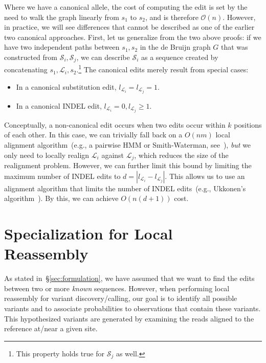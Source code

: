 \documentclass[11pt]{article}
\begin{document}
Where we have a canonical allele, the cost of computing the edit is set by the need to walk the graph
linearly from $s_1$ to $s_2$, and is therefore $\mathcal{O}(n)$. However, in practice, we will see
differences that cannot be described as one of the earlier two canonical approaches. First, let us
generalize from the two above proofs: if we have two independent paths between $s_1, s_2$ in the
de Bruijn graph $G$ that was constructed from $\mathcal{S}_i, \mathcal{S}_j$, we can describe
$\mathcal{S}_i$ as a sequence created by concatenating $s_1, \mathcal{L}_i, s_2$.\footnote{This
property holds true for $\mathcal{S}_j$ as well.} The canonical edits merely result from special cases:

\begin{itemize}
\item In a canonical substitution edit, $l_{\mathcal{L}_i} = l_{\mathcal{L}_j} = 1$.
\item In a canonical INDEL edit, $l_{\mathcal{L}_i} = 0, l_{\mathcal{L}_j} \ge 1$.
\end{itemize}

Conceptually, a non-canonical edit occurs when two edits occur within $k$ positions of each other. In
this case, we can trivially fall back on a $O(nm)$ local alignment algorithm~(e.g., a pairwise HMM or
Smith-Waterman, see~\cite{durbin98,smith81}), \emph{but} we only need to locally realign
$\mathcal{L}_i$ against $\mathcal{L}_j$, which reduces the size of the realignment problem. However, we
can further limit this bound by limiting the maximum number of INDEL edits to $d = | l_{\mathcal{L}_i} -
l_{\mathcal{L}_j} |$. This allows us to use an alignment algorithm that limits the number of INDEL
edits~(e.g., Ukkonen's algorithm~\cite{ukkonen85}). By this, we can achieve $O(n(d + 1))$ cost.

\section{Specialization for Local Reassembly}
\label{sec:local-reassembly}

As stated in~\S\ref{sec:formulation}, we have assumed that we want to find the edits between two or
more \emph{known} sequences. However, when performing local reassembly for variant discovery/calling,
our goal is to identify all possible variants and to associate probabilities to observations that contain these
variants. This hypothesized variants are generated by examining the reads aligned to the reference
at/near a given site.
\end{document}

